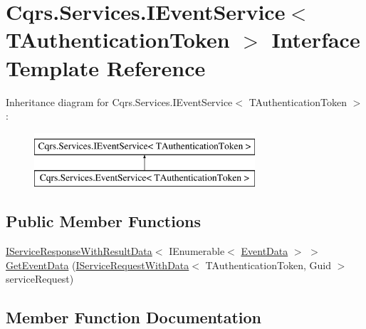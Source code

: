 \hypertarget{interfaceCqrs_1_1Services_1_1IEventService}{}\section{Cqrs.\+Services.\+I\+Event\+Service$<$ T\+Authentication\+Token $>$ Interface Template Reference}
\label{interfaceCqrs_1_1Services_1_1IEventService}
Inheritance diagram for Cqrs.\+Services.\+I\+Event\+Service$<$ T\+Authentication\+Token $>$\+:\begin{figure}[H]
\begin{center}
\leavevmode
\includegraphics[height=2.000000cm]{interfaceCqrs_1_1Services_1_1IEventService}
\end{center}
\end{figure}
\subsection*{Public Member Functions}
\begin{DoxyCompactItemize}
\item 
\hyperlink{interfaceCqrs_1_1Services_1_1IServiceResponseWithResultData}{I\+Service\+Response\+With\+Result\+Data}$<$ I\+Enumerable$<$ \hyperlink{classCqrs_1_1Events_1_1EventData}{Event\+Data} $>$ $>$ \hyperlink{interfaceCqrs_1_1Services_1_1IEventService_aa41b82bc398bfab0b2fd519d7f067946}{Get\+Event\+Data} (\hyperlink{interfaceCqrs_1_1Services_1_1IServiceRequestWithData}{I\+Service\+Request\+With\+Data}$<$ T\+Authentication\+Token, Guid $>$ service\+Request)
\end{DoxyCompactItemize}


\subsection{Member Function Documentation}
\mbox{\label{interfaceCqrs_1_1Services_1_1IEventService_aa41b82bc398bfab0b2fd519d7f067946}} 
